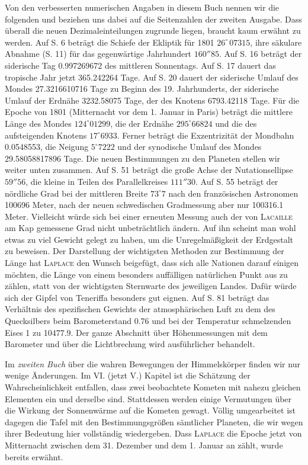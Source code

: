 Von den verbesserten numerischen Angaben in diesem Buch nennen wir die folgenden und beziehen uns dabei auf die Seitenzahlen der zweiten Ausgabe. Dass überall die neuen Dezimaleinteilungen zugrunde liegen, braucht kaum erwähnt zu werden. Auf S. 6 beträgt die Schiefe der Ekliptik für 1801 $26^{\circ}\,07315$, ihre säkulare Abnahme (S. 11) für das gegenwärtige Jahrhundert $160''85$. Auf S. 16 beträgt der siderische Tag 0.997269672 des mittleren Sonnentags. Auf S. 17 dauert das tropische Jahr jetzt 365.242264 Tage. Auf S. 20 dauert der siderische Umlauf des Mondes 27.3216610716 Tage zu Beginn des 19. Jahrhunderts, der siderische Umlauf der Erdnähe 3232.58075
 Tage, der des Knotens 6793.42118 Tage. Für die Epoche von 1801 (Mitternacht vor dem 1. Januar in Paris) beträgt die mittlere Länge des Mondes $124^{\circ}01299$, die der Erdnähe $295^{\circ}66824$ und die des aufsteigenden Knotens $17^{\circ}6933$. Ferner beträgt die Exzentrizität der Mondbahn 0.0548553, die Neigung $5^{\circ}7222$ und der synodische Umlauf des Mondes 29.58058817896 Tage. Die neuen Bestimmungen zu den Planeten stellen wir weiter unten zusammen. Auf S. 51 beträgt die große Achse der Nutationsellipse $59''56$, die kleine in Teilen des Parallelkreises $111''30$. Auf S. 55 beträgt der nördliche Grad bei der mittleren Breite $73^{\circ}7$ nach den französischen Astronomen 100696 Meter, nach der neuen schwedischen Gradmessung aber nur 100316.1 Meter. Vielleicht würde sich bei einer erneuten Messung auch der von \textsc{Lacaille} am Kap gemessene Grad nicht unbeträchtlich ändern. Auf ihn scheint man wohl etwas zu viel Gewicht gelegt zu haben, um die Unregelmäßigkeit der Erdgestalt zu beweisen. Der Darstellung der wichtigsten Methoden zur Bestimmung der Länge hat \textsc{Laplace} den Wunsch beigefügt, dass sich alle Nationen darauf einigen möchten, die Länge von einem besonders auffälligen natürlichen Punkt aus zu zählen, statt von der wichtigsten Sternwarte des jeweiligen Landes. Dafür würde sich der Gipfel von Teneriffa besonders gut eignen. Auf S. 81 beträgt das Verhältnis des spezifischen Gewichts der atmosphärischen Luft zu dem des Quecksilbers beim Barometerstand 0.76 und bei der Temperatur schmelzenden Eises 1 zu 10477.9. Der ganze Abschnitt über Höhenmessungen mit dem Barometer und über die Lichtbrechung wird ausführlicher behandelt.

Im \emph{zweiten Buch} über die wahren Bewegungen der Himmelskörper finden wir nur wenige Änderungen. Im VI. (jetzt V.) Kapitel ist die Schätzung der Wahrscheinlichkeit entfallen, dass zwei beobachtete Kometen mit nahezu gleichen Elementen ein und derselbe sind. Stattdessen werden einige Vermutungen über die Wirkung der Sonnenwärme auf die Kometen gewagt. Völlig umgearbeitet ist dagegen die Tafel mit den Bestimmungsgrößen sämtlicher Planeten, die wir wegen ihrer Bedeutung hier vollständig wiedergeben. Dass \textsc{Laplace} die Epoche jetzt von Mitternacht zwischen dem 31. Dezember und dem 1. Januar an zählt, wurde bereits erwähnt.

